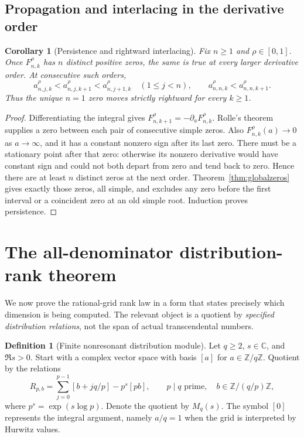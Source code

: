 \documentclass[11pt]{article}
\newtheorem{corollary}[theorem]{Corollary}
\theoremstyle{definition}
\newtheorem{definition}[theorem]{Definition}
\theoremstyle{remark}
\newcommand{\CC}{\mathbb C}
\newcommand{\ZZ}{\mathbb Z}
\begin{document}
\subsection{Propagation and interlacing in the derivative order}
\begin{corollary}[Persistence and rightward interlacing]\label{cor:interlacing}
Fix $n\geq1$ and $\rho\in[0,1]$. Once $F_{n,k}^{\rho}$ has $n$ distinct positive zeros, the same is true at every larger derivative order. At consecutive such orders,
\begin{equation}\label{eq:interlacing}
 a_{n,j,k}^{\rho}<a_{n,j,k+1}^{\rho}<a_{n,j+1,k}^{\rho}\quad(1\leq j<n),
 \qquad a_{n,n,k}^{\rho}<a_{n,n,k+1}^{\rho}.
\end{equation}
Thus the unique $n=1$ zero moves strictly rightward for every $k\geq1$.
\end{corollary}
\begin{proof}
Differentiating the integral gives $F_{n,k+1}^{\rho}=-\partial_aF_{n,k}^{\rho}$. Rolle's theorem supplies a zero between each pair of consecutive simple zeros. Also $F_{n,k}^{\rho}(a)\to0$ as $a\to\infty$, and it has a constant nonzero sign after its last zero. There must be a stationary point after that zero: otherwise its nonzero derivative would have constant sign and could not both depart from zero and tend back to zero. Hence there are at least $n$ distinct zeros at the next order. Theorem~\ref{thm:globalzeros} gives exactly those zeros, all simple, and excludes any zero before the first interval or a coincident zero at an old simple root. Induction proves persistence.
\end{proof}

\section{The all-denominator distribution-rank theorem}
\label{sec:rank}

We now prove the rational-grid rank law in a form that states precisely which dimension is being computed. The relevant object is a quotient by \emph{specified distribution relations}, not the span of actual transcendental numbers.

\begin{definition}[Finite nonresonant distribution module]\label{def:module}
Let $q\geq2$, $s\in\CC$, and $\Re s>0$. Start with a complex vector space with basis $[a]$ for $a\in\ZZ/q\ZZ$. Quotient by the relations
\begin{equation}\label{eq:relations}
 R_{p,b}=\sum_{j=0}^{p-1}[b+jq/p]-p^s[pb],
 \qquad p\mid q\text{ prime},\quad b\in\ZZ/(q/p)\ZZ,
\end{equation}
where $p^s=\exp(s\log p)$. Denote the quotient by $M_q(s)$. The symbol $[0]$ represents the integral argument, namely $a/q=1$ when the grid is interpreted by Hurwitz values.
\end{definition}
\end{document}
